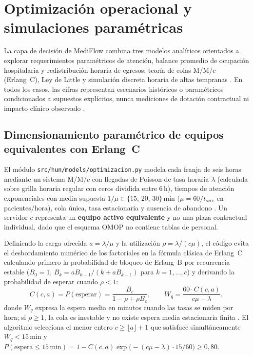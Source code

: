 
\section{Optimización operacional y simulaciones paramétricas}

La capa de decisión de MediFlow combina tres modelos analíticos orientados a explorar requerimientos paramétricos de atención, balance promedio de ocupación hospitalaria y redistribución horaria de egresos: teoría de colas M/M/$c$ (Erlang~C), Ley de Little y simulación discreta horaria de altas tempranas \parencite{mediflow2026optimizacion,mediflow2026informe}. En todos los casos, las cifras representan escenarios históricos o paramétricos condicionados a supuestos explícitos, nunca mediciones de dotación contractual ni impacto clínico observado \parencite{green2006queueing}.

\subsection{Dimensionamiento paramétrico de equipos equivalentes con Erlang~C}

El módulo \texttt{src/hun/models/optimizacion.py} modela cada franja de seis horas mediante un sistema M/M/$c$ con llegadas de Poisson de tasa horaria $\lambda$ (calculada sobre grilla horaria regular con ceros dividida entre 6\,h), tiempos de atención exponenciales con media supuesta $1/\mu \in \{15,\, 20,\, 30\}\,\text{min}$ ($\mu = 60 / t_{\text{serv}}$ en pacientes/hora), cola única, tasa estacionaria y ausencia de abandono \parencite{green2006queueing,mediflow2026optimizacion}. Un servidor $c$ representa un \textbf{equipo activo equivalente} y no una plaza contractual individual, dado que el esquema OMOP no contiene tablas de personal.

Definiendo la carga ofrecida $a = \lambda / \mu$ y la utilización $\rho = \lambda / (c\mu)$, el código evita el desbordamiento numérico de los factoriales en la fórmula clásica de Erlang~C calculando primero la probabilidad de bloqueo de Erlang~B por recurrencia estable ($B_0 = 1$, $B_k = a B_{k-1} / (k + a B_{k-1})$ para $k = 1,\dots,c$) y derivando la probabilidad de esperar cuando $\rho < 1$:
\begin{equation}
\label{eq:erlang_c}
C(c, a) = P(\text{esperar}) = \frac{B_c}{1 - \rho + \rho B_c}, \qquad
W_q = \frac{60 \cdot C(c, a)}{c\mu - \lambda},
\end{equation}
donde $W_q$ expresa la espera media en minutos cuando las tasas se miden por hora; si $\rho \ge 1$, la cola es inestable y no existe espera media estacionaria finita \parencite{mediflow2026optimizacion}. El algoritmo selecciona el menor entero $c \ge \lfloor a \rfloor + 1$ que satisface simultáneamente $W_q < 15\,\text{min}$ y $P(\text{espera} \le 15\,\text{min}) = 1 - C(c, a)\exp\!\bigl(-(c\mu - \lambda)\cdot 15 / 60\bigr) \ge 0{,}80$.

